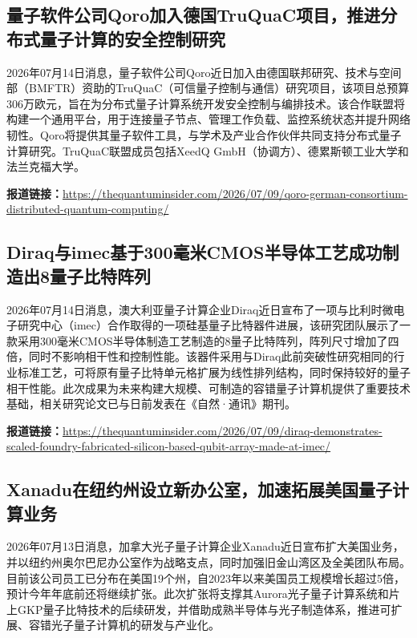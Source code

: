 \documentclass[12pt,a4paper]{ctexart}
\begin{document}
\subsection{ 量子软件公司Qoro加入德国TruQuaC项目，推进分布式量子计算的安全控制研究 }

2026年07月14日消息，量子软件公司Qoro近日加入由德国联邦研究、技术与空间部（BMFTR）资助的TruQuaC（可信量子控制与通信）研究项目，该项目总预算306万欧元，旨在为分布式量子计算系统开发安全控制与编排技术。该合作联盟将构建一个通用平台，用于连接量子节点、管理工作负载、监控系统状态并提升网络韧性。Qoro将提供其量子软件工具，与学术及产业合作伙伴共同支持分布式量子计算研究。TruQuaC联盟成员包括XeedQ GmbH（协调方）、德累斯顿工业大学和法兰克福大学。

\noindent\textbf{报道链接：}\url{https://thequantuminsider.com/2026/07/09/qoro-german-consortium-distributed-quantum-computing/}

\subsection{ Diraq与imec基于300毫米CMOS半导体工艺成功制造出8量子比特阵列 }

2026年07月14日消息，澳大利亚量子计算企业Diraq近日宣布了一项与比利时微电子研究中心（imec）合作取得的一项硅基量子比特器件进展，该研究团队展示了一款采用300毫米CMOS半导体制造工艺制造的8量子比特阵列，阵列尺寸增加了四倍，同时不影响相干性和控制性能。该器件采用与Diraq此前突破性研究相同的行业标准工艺，可将原有量子比特单元格扩展为线性排列结构，同时保持较好的量子相干性能。此次成果为未来构建大规模、可制造的容错量子计算机提供了重要技术基础，相关研究论文已与日前发表在《自然·通讯》期刊。

\noindent\textbf{报道链接：}\url{https://thequantuminsider.com/2026/07/09/diraq-demonstrates-scaled-foundry-fabricated-silicon-based-qubit-array-made-at-imec/}

\subsection{ Xanadu在纽约州设立新办公室，加速拓展美国量子计算业务 }

2026年07月13日消息，加拿大光子量子计算企业Xanadu近日宣布扩大美国业务，并以纽约州奥尔巴尼办公室作为战略支点，同时加强旧金山湾区及全美团队布局。目前该公司员工已分布在美国19个州，自2023年以来美国员工规模增长超过5倍，预计今年年底前还将继续扩张。此次扩张将支撑其Aurora光子量子计算系统和片上GKP量子比特技术的后续研发，并借助成熟半导体与光子制造体系，推进可扩展、容错光子量子计算机的研发与产业化。
\end{document}
